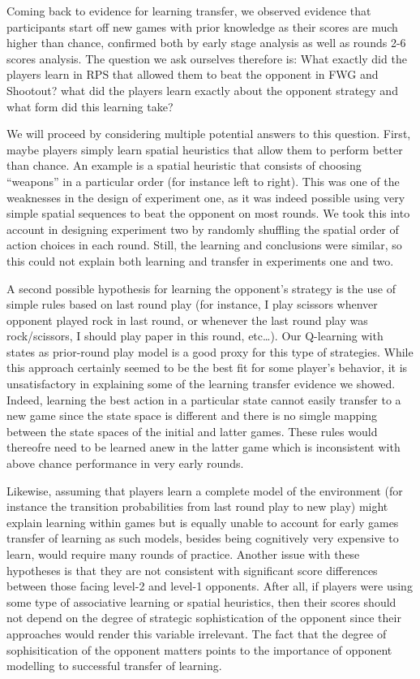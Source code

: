 \documentclass[man,floatsintext]{apa6}
\begin{document}
Coming back to evidence for learning transfer, we observed evidence that participants start off new games with prior knowledge as their scores are much higher than chance, confirmed both by early stage analysis as well as rounds 2-6 scores analysis. The question we ask ourselves therefore is: What exactly did the players learn in RPS that allowed them to beat the opponent in FWG and Shootout? what did the players learn exactly about the opponent strategy and what form did this learning take?

We will proceed by considering multiple potential answers to this question. First, maybe players simply learn spatial heuristics that allow them to perform better than chance. An example is a spatial heuristic that consists of choosing ``weapons'' in a particular order (for instance left to right). This was one of the weaknesses in the design of experiment one, as it was indeed possible using very simple spatial sequences to beat the opponent on most rounds. We took this into account in designing experiment two by randomly shuffling the spatial order of action choices in each round. Still, the learning and conclusions were similar, so this could not explain both learning and transfer in experiments one and two.

A second possible hypothesis for learning the opponent's strategy is the use of simple rules based on last round play (for instance, I play scissors whenver opponent played rock in last round, or whenever the last round play was rock/scissors, I should play paper in this round, etc\ldots{}). Our Q-learning with states as prior-round play model is a good proxy for this type of strategies. While this approach certainly seemed to be the best fit for some player's behavior, it is unsatisfactory in explaining some of the learning transfer evidence we showed. Indeed, learning the best action in a particular state cannot easily transfer to a new game since the state space is different and there is no simgle mapping between the state spaces of the initial and latter games. These rules would thereofre need to be learned anew in the latter game which is inconsistent with above chance performance in very early rounds.

Likewise, assuming that players learn a complete model of the environment (for instance the transition probabilities from last round play to new play) might explain learning within games but is equally unable to account for early games transfer of learning as such models, besides being cognitively very expensive to learn, would require many rounds of practice. Another issue with these hypotheses is that they are not consistent with significant score differences between those facing level-2 and level-1 opponents. After all, if players were using some type of associative learning or spatial heuristics, then their scores should not depend on the degree of strategic sophistication of the opponent since their approaches would render this variable irrelevant. The fact that the degree of sophisitication of the opponent matters points to the importance of opponent modelling to successful transfer of learning.
\end{document}
